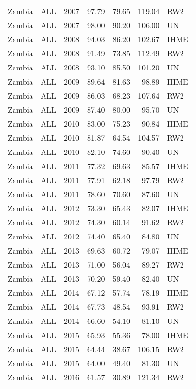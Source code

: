 \begin{longtable}{lllrrrl}
  Zambia & ALL & 2007 & 97.79 & 79.65 & 119.04 & RW2 \\ 
  Zambia & ALL & 2007 & 98.00 & 90.20 & 106.00 & UN \\ 
  Zambia & ALL & 2008 & 94.03 & 86.20 & 102.67 & IHME \\ 
  Zambia & ALL & 2008 & 91.49 & 73.85 & 112.49 & RW2 \\ 
  Zambia & ALL & 2008 & 93.10 & 85.50 & 101.20 & UN \\ 
  Zambia & ALL & 2009 & 89.64 & 81.63 & 98.89 & IHME \\ 
  Zambia & ALL & 2009 & 86.03 & 68.23 & 107.64 & RW2 \\ 
  Zambia & ALL & 2009 & 87.40 & 80.00 & 95.70 & UN \\ 
  Zambia & ALL & 2010 & 83.00 & 75.23 & 90.84 & IHME \\ 
  Zambia & ALL & 2010 & 81.87 & 64.54 & 104.57 & RW2 \\ 
  Zambia & ALL & 2010 & 82.10 & 74.60 & 90.40 & UN \\ 
  Zambia & ALL & 2011 & 77.32 & 69.63 & 85.57 & IHME \\ 
  Zambia & ALL & 2011 & 77.91 & 62.18 & 97.79 & RW2 \\ 
  Zambia & ALL & 2011 & 78.60 & 70.60 & 87.60 & UN \\ 
  Zambia & ALL & 2012 & 73.30 & 65.43 & 82.07 & IHME \\ 
  Zambia & ALL & 2012 & 74.30 & 60.14 & 91.62 & RW2 \\ 
  Zambia & ALL & 2012 & 74.40 & 65.40 & 84.80 & UN \\ 
  Zambia & ALL & 2013 & 69.63 & 60.72 & 79.07 & IHME \\ 
  Zambia & ALL & 2013 & 71.00 & 56.04 & 89.27 & RW2 \\ 
  Zambia & ALL & 2013 & 70.20 & 59.40 & 82.40 & UN \\ 
  Zambia & ALL & 2014 & 67.12 & 57.74 & 78.19 & IHME \\ 
  Zambia & ALL & 2014 & 67.73 & 48.54 & 93.91 & RW2 \\ 
  Zambia & ALL & 2014 & 66.60 & 54.10 & 81.10 & UN \\ 
  Zambia & ALL & 2015 & 65.93 & 55.36 & 78.00 & IHME \\ 
  Zambia & ALL & 2015 & 64.44 & 38.67 & 106.15 & RW2 \\ 
  Zambia & ALL & 2015 & 64.00 & 49.40 & 81.30 & UN \\ 
  Zambia & ALL & 2016 & 61.57 & 30.89 & 121.34 & RW2 \\ 

\end{longtable}
